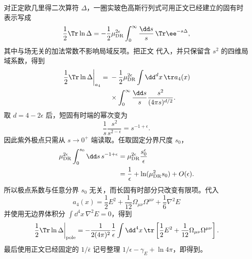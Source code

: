 \begin{derivation}[固有时积分中的一圈紫外发散]

对正定欧几里得二次算符 $\Delta$，一圈实玻色高斯行列式可用正文已经建立的固有时表示写成
\[
\frac12\Tr\ln\Delta
=-\frac12\mu_{\rm DR}^{2\epsilon}
\int_0^\infty\frac{\dd s}{s}\,
\Tr \ee^{-s\Delta},
\]
其中与场无关的加法常数不影响局域反项。把正文 代入，并只保留含 $s^2$ 的四维局域系数，得到
\begin{align*}
\left.\frac12\Tr\ln\Delta\right|_{a_4}
={}&-\frac12\mu_{\rm DR}^{2\epsilon}
\int\dd^d x\,
\tr a_4(x)\\
&\times\int_0^\infty\frac{\dd s}{s}
\frac{s^2}{(4\pi s)^{d/2}}.
\end{align*}
取 $d=4-2\epsilon$ 后，短固有时端的幂次变为
\[
\frac1s\frac{s^2}{s^{2-\epsilon}}
=s^{-1+\epsilon}.
\]
因此紫外极点只需从 $s\to0^+$ 端读取。任取固定分界尺度 $s_0$，
\begin{align*}
\mu_{\rm DR}^{2\epsilon}
\int_0^{s_0}\dd s\,s^{-1+\epsilon}
&=\mu_{\rm DR}^{2\epsilon}
\frac{s_0^\epsilon}{\epsilon}\\
&=\frac1\epsilon
+\ln(\mu_{\rm DR}^2s_0)+O(\epsilon).
\end{align*}
所以极点系数与任意分界 $s_0$ 无关，而长固有时部分只改变有限项。代入
\[
 a_4(x)
 =\frac12E^2
 +\frac1{12}\Omega_{\mu\nu}\Omega^{\mu\nu}
 +\frac16\nabla^2E
\]
并使用无边界体积分
\(
\int\dd^4 x\,\nabla^2E=0
\)，得到
\[
\left.\frac12\Tr\ln\Delta\right|_{\rm pole}
=-\frac1{2(4\pi)^2}\frac1\epsilon
\int\dd^4 x\,
\tr\left[
\frac12E^2+\frac1{12}\Omega_{\mu\nu}\Omega^{\mu\nu}
\right].
\]
最后使用正文已经固定的 $1/\bar\epsilon$ 记号整理 $1/\epsilon-\gamma_E+\ln4\pi$，即得到。
\end{derivation}

